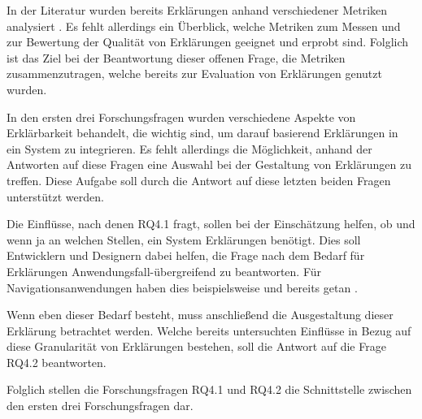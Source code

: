 In der Literatur wurden bereits Erklärungen anhand verschiedener Metriken analysiert \cite{wiegand2019drive,briand1995goal}. Es fehlt allerdings ein Überblick, welche Metriken zum Messen und zur Bewertung der Qualität von Erklärungen geeignet und erprobt sind. Folglich ist das Ziel bei der Beantwortung dieser offenen Frage, die Metriken zusammenzutragen, welche bereits zur Evaluation von Erklärungen genutzt wurden.

\smallskip

\noindent{}

\smallskip

In den ersten drei Forschungsfragen wurden verschiedene Aspekte von Erklärbarkeit behandelt, die wichtig sind, um darauf basierend Erklärungen in ein System zu integrieren. Es fehlt allerdings die Möglichkeit, anhand der Antworten auf diese Fragen eine Auswahl bei der Gestaltung von Erklärungen zu treffen. Diese Aufgabe soll durch die Antwort auf diese letzten beiden Fragen unterstützt werden.

Die Einflüsse, nach denen RQ4.1 fragt, sollen bei der Einschätzung helfen, ob und wenn ja an welchen Stellen, ein System Erklärungen benötigt. Dies soll Entwicklern und Designern dabei helfen, die Frage nach dem Bedarf für Erklärungen Anwendungsfall-übergreifend zu beantworten. Für Navigationsanwendungen haben dies beispielsweise \citeauthor{chazette_end-users_nodate} und \citeauthor{wang_integration_2020} bereits getan \cite{chazette_end-users_nodate,wang_integration_2020}.

Wenn eben dieser Bedarf besteht, muss anschließend die Ausgestaltung dieser Erklärung betrachtet werden. Welche bereits untersuchten Einflüsse in Bezug auf diese Granularität von Erklärungen bestehen, soll die Antwort auf die Frage RQ4.2 beantworten.

Folglich stellen die Forschungsfragen RQ4.1 und RQ4.2 die Schnittstelle zwischen den ersten drei Forschungsfragen dar.


